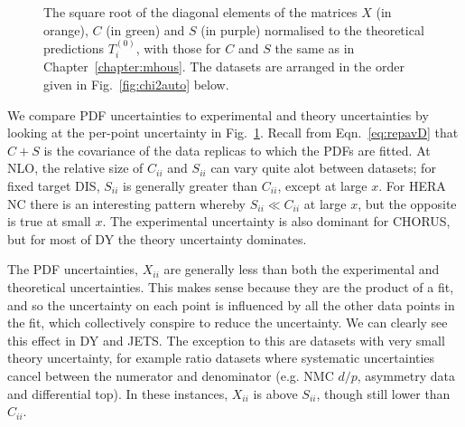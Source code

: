  \begin{figure}[H]
    \begin{center}
    \end{center}
  \vspace{-0.55cm}
  \caption{The square root of the diagonal elements of the matrices $X$ (in orange), $C$ (in green) and $S$ (in purple) normalised to the theoretical predictions $T^{(0)}_i$, with those for $C$ and $S$ the same as in Chapter~\ref{chapter:mhous}. The datasets are arranged in the order given in Fig.~\ref{fig:chi2auto} below.}
  \label{fig:CXS}
\end{figure}
We compare PDF uncertainties to experimental and theory uncertainties by looking at the per-point uncertainty in Fig.~\ref{fig:CXS}. Recall from Eqn.~\ref{eq:repavD} that $C+S$ is the covariance of the data replicas to which the PDFs are fitted. At NLO, the relative size of $C_{ii}$ and $S_{ii}$ can vary quite  alot between datasets; for fixed target DIS, $S_{ii}$ is generally greater than $C_{ii}$, except at large $x$. For HERA NC there is an interesting pattern whereby $S_{ii} \ll C_{ii}$ at large $x$, but the opposite is true at small $x$. The experimental uncertainty is also dominant for CHORUS, but for most of DY the theory uncertainty dominates. 

The PDF uncertainties, $X_{ii}$ are generally less than both the experimental and theoretical uncertainties. This makes sense because they are the product of a fit, and so the uncertainty on each point is influenced by all the other data points in the fit, which collectively conspire to reduce the uncertainty. We can clearly see this effect in DY and JETS. The exception to this are datasets with very small theory uncertainty, for example ratio datasets where systematic uncertainties cancel between the numerator and denominator (e.g. NMC $d/p$, asymmetry data and differential top). In these instances, $X_{ii}$ is above $S_{ii}$, though still lower than $C_{ii}$.

